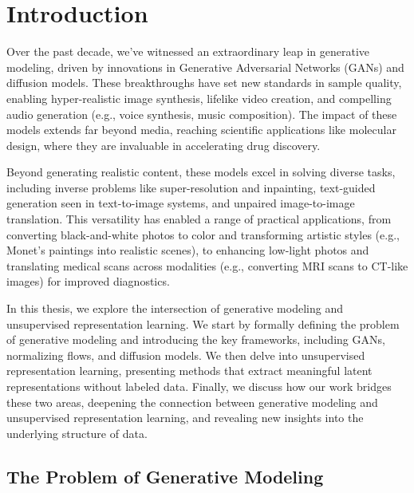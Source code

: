 
\chapter{Introduction}

Over the past decade, we’ve witnessed an extraordinary leap in generative modeling, driven by innovations in Generative Adversarial Networks (GANs) and diffusion models. These breakthroughs have set new standards in sample quality, enabling hyper-realistic image synthesis, lifelike video creation, and compelling audio generation (e.g., voice synthesis, music composition). The impact of these models extends far beyond media, reaching scientific applications like molecular design, where they are invaluable in accelerating drug discovery.

Beyond generating realistic content, these models excel in solving diverse tasks, including inverse problems like super-resolution and inpainting, text-guided generation seen in text-to-image systems, and unpaired image-to-image translation. This versatility has enabled a range of practical applications, from converting black-and-white photos to color and transforming artistic styles (e.g., Monet’s paintings into realistic scenes), to enhancing low-light photos and translating medical scans across modalities (e.g., converting MRI scans to CT-like images) for improved diagnostics.

In this thesis, we explore the intersection of generative modeling and unsupervised representation learning. We start by formally defining the problem of generative modeling and introducing the key frameworks, including GANs, normalizing flows, and diffusion models. We then delve into unsupervised representation learning, presenting methods that extract meaningful latent representations without labeled data. Finally, we discuss how our work bridges these two areas, deepening the connection between generative modeling and unsupervised representation learning, and revealing new insights into the underlying structure of data.

\section{The Problem of Generative Modeling}

